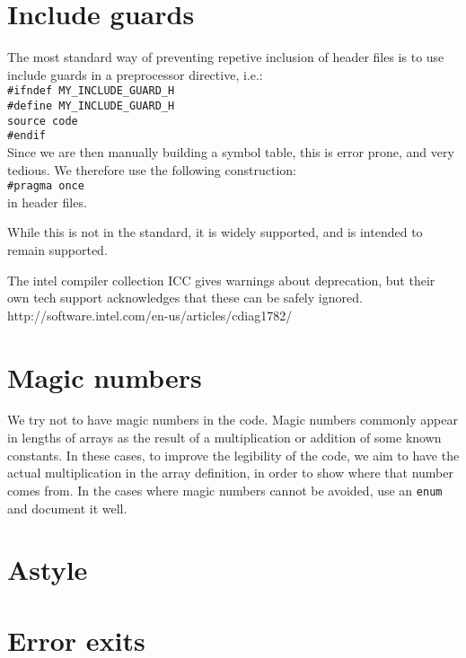 \documentclass[a4paper,10pt]{article}
\begin{document}
\section{Include guards}
The most standard way of preventing repetive inclusion of header files is to use include guards in a preprocessor directive, i.e.:\\
\verb|#ifndef MY_INCLUDE_GUARD_H|\\
\verb|#define MY_INCLUDE_GUARD_H|\\
\verb|source code|\\
\verb|#endif|\\
Since we are then manually building a symbol table, this is error prone, and very tedious. We therefore use the following construction:\\
\verb|#pragma once|\\
in header files.

While this is not in the standard, it is widely supported, and is intended to remain supported.

The intel compiler collection ICC gives warnings about deprecation, but their own tech support acknowledges that these can be safely ignored.\\
http://software.intel.com/en-us/articles/cdiag1782/
\section{Magic numbers}
We try not to have magic numbers in the code. Magic numbers commonly appear in lengths of arrays as the result of a multiplication or addition of some known constants. In these cases, to improve the legibility of the code, we aim to have the actual multiplication in the array definition, in order to show where that number comes from. In the cases where magic numbers cannot be avoided, use an \verb|enum| and document it well.
\section{Astyle}
\section{Error exits}
\end{document}
